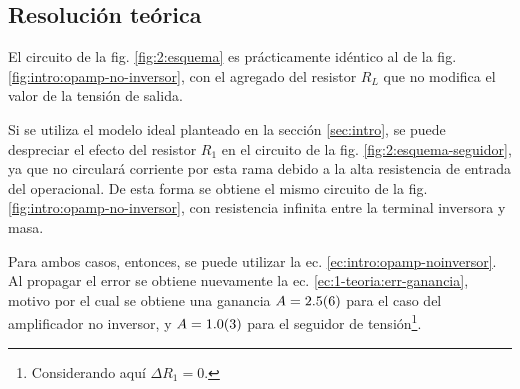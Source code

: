 \subsection{Resolución teórica}

El circuito de la fig. \ref{fig:2:esquema} es prácticamente idéntico al de
la fig. \ref{fig:intro:opamp-no-inversor}, con el agregado del resistor $R_L$
que no modifica el valor de la tensión de salida.

Si se utiliza el modelo ideal planteado en la sección
\ref{sec:intro}, se puede despreciar el efecto del resistor
$R_1$ en el circuito de la fig. \ref{fig:2:esquema-seguidor}, ya que no
circulará corriente por esta rama debido a la alta resistencia de entrada del
operacional. De esta forma se obtiene el mismo circuito de la fig.
\ref{fig:intro:opamp-no-inversor}, con resistencia infinita entre la terminal
inversora y masa.

Para ambos casos, entonces, se puede utilizar la ec.
\ref{ec:intro:opamp-noinversor}. Al propagar el error se obtiene nuevamente
la ec. \ref{ec:1-teoria:err-ganancia}, motivo por el cual se obtiene una 
ganancia $A = \num{2.5 \pm 0.6}$ para el caso del amplificador no inversor,
y $A = \num{1.0 \pm 0.3}$ para el seguidor de
tensión\footnote{Considerando aquí $\Delta R_1 = 0$.}.
